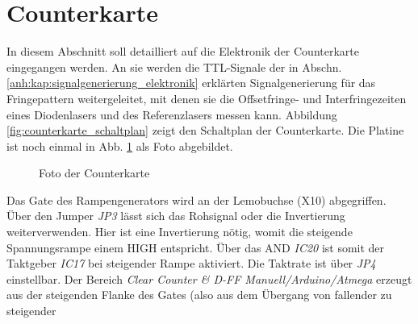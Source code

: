 \section{Counterkarte}\label{anh:sec:counterkarte}
In diesem Abschnitt soll detailliert auf die Elektronik der Counterkarte
eingegangen werden. An sie werden die TTL-Signale der in Abschn.
\ref{anh:kap:signalgenerierung_elektronik} erklärten Signalgenerierung für das
Fringepattern weitergeleitet, mit denen sie die Offsetfringe- und
Interfringezeiten eines Diodenlasers und des Referenzlasers messen kann.
Abbildung \ref{fig:counterkarte_schaltplan} zeigt den Schaltplan der
Counterkarte. Die Platine ist noch einmal in Abb.
\ref{fig:counterkarte_foto} als Foto abgebildet.\par
\begin{figure}[h]
 	\centering
	\caption[Counterkarte -
	Foto]{Foto der Counterkarte}\label{fig:counterkarte_foto}
\end{figure}
Das Gate des Rampengenerators wird an der Lemobuchse (X10) abgegriffen.
Über den Jumper \textit{JP3} lässt sich das Rohsignal oder die Invertierung weiterverwenden.
Hier ist eine Invertierung nötig, womit die steigende Spannungsrampe einem HIGH entspricht.
Über das AND \textit{IC20} ist somit der Taktgeber \textit{IC17} bei steigender
Rampe aktiviert. Die Taktrate ist über \textit{JP4} einstellbar. Der Bereich
\textit{Clear Counter \& D-FF Manuell/Arduino/Atmega} erzeugt aus der
steigenden Flanke des Gates (also aus dem Übergang von fallender zu steigender
